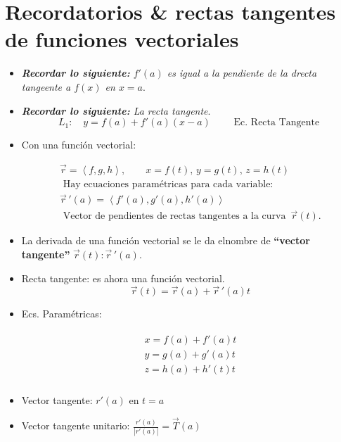 \section{Recordatorios \& rectas tangentes de funciones vectoriales}
\begin{itemize}
    \item \emph{\textbf{Recordar lo siguiente: }$f'(a)$ es igual a la pendiente de la drecta tangeente a $f(x)$ en $x=a$}.
    \item \emph{\textbf{Recordar lo siguiente: }La recta tangente}.
        \[
          L_1: \quad y = f(a)+f'(a)(x-a) \quad \quad \text{  Ec. Recta Tangente  }
        \]
    
    \item Con una función vectorial:
        \begin{center}
            \begin{align*}
                \vec{r}= \left\langle f,g,h \right\rangle , \quad \quad x = f(t), \, y=g(t), \, z=h(t) \\ 
                \text{  Hay ecuaciones paramétricas para cada variable:  } \\ 
                \vec{r}\,'(a) = \left\langle f'(a),g'(a),h'(a) \right\rangle \\ 
                \text{  Vector de pendientes de rectas tangentes a la curva  } \, \vec{r}(t).
            \end{align*}
        \end{center}
    
    \item La derivada de una función vectorial se le da elnombre de \textbf{``vector tangente''} $\vec{r}(t):\vec{r}\,'(a)$.
    \item Recta tangente: es ahora una función vectorial.
        \[
          \vec{r}(t) = \vec{r}(a) + \vec{r}\,'(a)t 
        \]
    
    \item Ecs. Paramétricas:
        \begin{center}
            \begin{align*}
                \begin{matrix}
                    x=f(a)+f'(a)t \\ 
                    y=g(a)+g'(a)t \\ 
                    z=h(a)+h'(t)t \\ 
                \end{matrix}
            \end{align*}
        \end{center}
    
    \item Vector tangente: $r'(a)$ en $t=a$
    \item Vector tangente unitario: $\frac{r'(a)}{\left| r'(a) \right| } = \vec{T}(a)$
\end{itemize}



